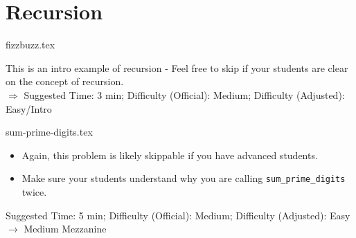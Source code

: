 \documentclass{exam}
\begin{document}
\section{Recursion}
\begin{questions}
    {fizzbuzz.tex}
    \begin{questionmeta}
        This is an intro example of recursion - Feel free to skip if your students are clear on the concept of recursion.\\
        $\Rightarrow$ Suggested Time: 3 min; Difficulty (Official): Medium; Difficulty (Adjusted): Easy/Intro
      \end{questionmeta}

    {sum-prime-digits.tex}
    \begin{questionmeta}
        \begin{itemize}
            \item Again, this problem is likely skippable if you have advanced students.
            \item Make sure your students understand why you are calling \lstinline{sum_prime_digits} twice.
        \end{itemize}    
        Suggested Time: 5 min; Difficulty (Official): Medium; Difficulty (Adjusted): Easy $\rightarrow$ Medium Mezzanine
      \end{questionmeta}
    
\end{questions}
\end{document}
